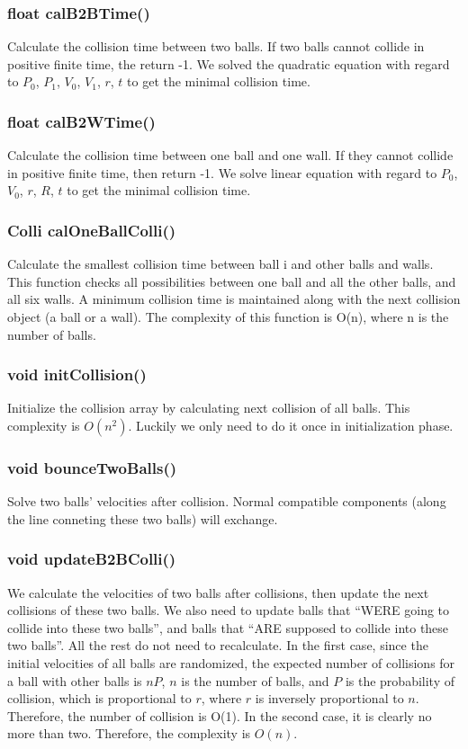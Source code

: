 \documentclass[twoside,11pt]{article}
\begin{document}
\subsubsection{float calB2BTime()}
Calculate the collision time between two balls. If two balls cannot collide in positive finite time, the return -1. We solved the quadratic equation with regard to $P_0$, $P_1$, $V_0$, $V_1$, $r$, $t$ to get the minimal collision time.

\subsubsection{float calB2WTime()}
Calculate the collision time between one ball and one wall. If they cannot collide in positive finite time, then return -1. We solve linear equation with regard to $P_0$, $V_0$, $r$, $R$, $t$ to get the minimal collision time.

\subsubsection{Colli calOneBallColli()}
Calculate the smallest collision time between ball i and other balls and walls. This function checks all possibilities between one ball and all the other balls, and all six walls. A minimum collision time is maintained along with the next collision object (a ball or a wall). The complexity of this function is O(n), where n is the number of balls.

\subsubsection{void initCollision()}
Initialize the collision array by calculating next collision of all balls. This complexity is $O(n^2)$. Luckily we only need to do it once in initialization phase. 

\subsubsection{void bounceTwoBalls()}
Solve two balls' velocities after collision. Normal compatible components (along the line conneting these two balls) will exchange. 

\subsubsection{void updateB2BColli()}
We calculate the velocities of two balls after collisions, then update the next collisions of these two balls. We also need to update balls that ``WERE going to collide into these two balls'', and balls that ``ARE supposed to collide into these two balls''. All the rest do not need to recalculate. In the first case, since the initial velocities of all balls are randomized, the expected number of collisions for a ball with other balls is $nP$, $n$ is the number of balls, and $P$ is the probability of collision, which is proportional to $r$, where $r$ is inversely proportional to $n$. Therefore, the number of collision is O(1). In the second case, it is clearly no more than two. Therefore, the complexity is $O(n)$.
\end{document}
